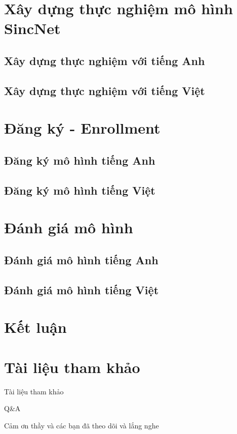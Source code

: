 \documentclass[11pt]{beamer}
\begin{document}
\section{Xây dựng thực nghiệm mô hình SincNet}
\subsection{Xây dựng thực nghiệm với tiếng Anh}
\begin{frame}
\end{frame}
\subsection{Xây dựng thực nghiệm với tiếng Việt}
\begin{frame}
\end{frame}
\section{Đăng ký - Enrollment}
\subsection{Đăng ký mô hình tiếng Anh}
\begin{frame}
\end{frame}
\subsection{Đăng ký mô hình tiếng Việt}
\begin{frame}
\end{frame}
\section{Đánh giá mô hình}
\subsection{Đánh giá mô hình tiếng Anh}
\begin{frame}
\end{frame}
\subsection{Đánh giá mô hình tiếng Việt}
\begin{frame}
\end{frame}
\section{Kết luận}

\section{Tài liệu tham khảo}
\begin{frame}{Tài liệu tham khảo}
	\nocite{*}
	\newpage\cleardoublepage
	
\end{frame}


\begin{frame}{Q\&A}
	\begin{center}
		\Huge Cảm ơn thầy và các bạn đã theo dõi và lắng nghe
	\end{center}
\end{frame}
\end{document}
